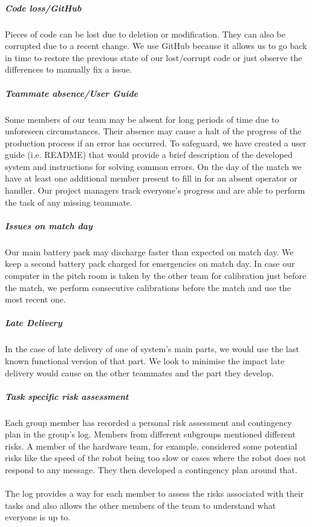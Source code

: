 \subparagraph{Code loss/GitHub}
Pieces of code can be lost due to deletion or modification. They can also be corrupted due to a recent change. We use GitHub because it allows us to go back in time to restore the previous state of our lost/corrupt code or just observe the differences to manually fix a issue.

\subparagraph{Teammate absence/User Guide}
Some members of our team may be absent for long periods of time due to unforeseen circumstances. Their absence may cause a halt of the progress of the production process if an error has occurred. To safeguard, we have created a user guide (i.e. README) that would provide a brief description of the developed system and  instructions for solving common errors. On the day of the match we have at least one additional member present to fill in for an absent operator or handler.  Our project managers track everyone's progress and are able to perform the task of any missing teammate. 

\subparagraph{Issues on match day}
Our main battery pack may discharge faster than expected on match day. We keep a second battery pack charged for emergencies on match day. In case our computer in the pitch room is taken by the other team for calibration just before the match, we perform consecutive calibrations before the match and use the most recent one.

\subparagraph{Late Delivery}
In the case of late delivery of one of system's main parts, we would use the last known functional version of that part. We look to minimise the impact late delivery would cause on the other teammates and the part they develop.

\subparagraph{Task specific risk assessment}
Each group member has recorded a personal risk assessment and contingency plan in the group's log. Members from different subgroups mentioned different risks. A member of the hardware team, for example,   considered some potential risks like the speed of the robot being too slow or cases where the robot does not respond to any message. They then developed a contingency plan around that. 
\\ \\ The log provides a way for each member to assess the risks associated with their tasks and also allows the other members of the team to understand what everyone is up to.

\iffalse
key is hidden in safe place
have 2 code repos we have run - fred and craig's robot
what to do in budget inefficiency?
how to test if pitch is full?
IDEAS
Where should staff meet in the event the building is not accessible?
Who has the authority to close the business in the event of an emergency?
Which staff members are critical and must be on-site or always reachable?
Where are the back-ups and how are they restored?
Who can cover for each critical staff member?
Who are single points of failure and how can those risks be ameliorated?
What systems, vendors, and partners pose risk should they fail?
Who is responsible for communicating with customers, and how?
\fi